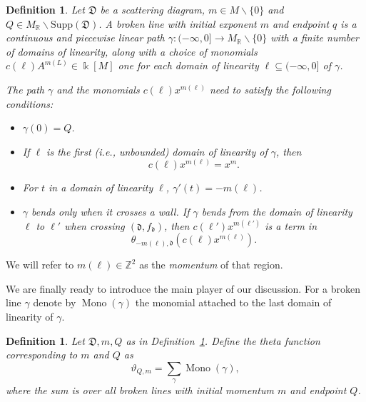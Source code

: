 \documentclass[10pt]{amsart}
\newtheorem{defn}[theorem]{Definition}
\theoremstyle{remark}
\numberwithin{equation}{section}
\newcommand{\RR}{\mathbb{R}}
\newcommand{\fd}{\mathfrak{d}}
\newcommand{\fD}{\mathfrak{D}}
\newcommand{\Mono}{\operatorname{Mono}}
\begin{document}
\begin{defn} 
  \label{brokendef}
  Let $\fD$ be a scattering diagram, $m \in M \backslash \{0\}$ and $Q \in
  M_{\RR} \backslash \text{Supp}(\fD)$.  A \emph{broken line} with initial
  \emph{exponent} $m$ and endpoint $q$ is a continuous and piecewise linear path
  $\gamma : ( - \infty , 0] \rightarrow M_{\mathbb{R}} \backslash \{ 0\} $ with
  a finite number of domains of linearity, along with a choice of monomials
  $c(\ell) A^{m(L)} \in \Bbbk[M]$ one for each domain of linearity $\ell \subseteq ( -
  \infty, 0]$ of $\gamma$. 
  
  The path $\gamma$ and the monomials $c(\ell) x^{m(\ell)}$ need to satisfy the
  following conditions:
  \begin{itemize}
    \item 
      $\gamma(0) = Q$.
    
    \item 
      If $\ell$ is the first (i.e., unbounded) domain of linearity of $\gamma$,
      then 
      \[
        c(\ell) x^{m(\ell)} = x^{m}.
      \]

    \item 
      For $t$ in a domain of linearity $\ell$, $\gamma'(t) = -m(\ell)$.

    \item 
      $\gamma$ bends only when it crosses a wall. If $\gamma$ bends from the
      domain of linearity $\ell$ to $ \ell'$ when crossing $(\fd, f_{\fd})$, then
      $c(\ell')x^{m(\ell')}$ is a term in 
      \[
        \theta_{-m(\ell), \fd} \left(c(\ell) x^{m(\ell)}\right).
      \]
  \end{itemize}
\end{defn}
We will refer to $m(\ell)\in \mathbb{Z}^2$ as the \emph{momentum} of that region.

We are finally ready to introduce the main player of our discussion.
For a broken line $\gamma$  denote by
$\Mono (\gamma)$ the monomial attached to the last domain of linearity of $\gamma$.
\begin{defn}
  Let $\fD, m, Q$ as in Definition~\ref{brokendef}.  Define the \emph{theta function} corresponding to $m$ and $Q$
  as
  \[ 
    \vartheta_{Q, m} = \sum_{\gamma} \Mono (\gamma), 
  \] 
  where the sum is over all broken lines with initial momentum $m$ and endpoint
  $Q$.
\end{defn}
\end{document}
